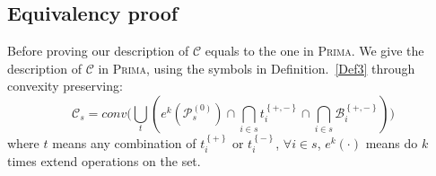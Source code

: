 \documentclass[runningheads]{llncs}
\newcommand{\prima}{\textsc{Prima}\xspace}
\begin{document}
\subsection{Equivalency proof}\label{equivalency proof}
Before proving our description of $\mathcal{C}$ equals to the one in \prima. We give the description of $\mathcal{C}$ in \prima, using the symbols in Definition.~\ref{Def3} through convexity preserving:
\begin{equation}\label{prima C}
\mathcal{C}_{s} = conv\big( \bigcup_{t} ( e^{k}(\mathcal{P}_{s}^{(0)})\cap \bigcap_{i \in s}^{}t_{i}^{\left\{ +,-\right\}} \cap \bigcap_{i \in s}^{}\mathcal{B}_{i}^{\left\{ +,-\right\}} ) \big)
\end{equation}
where $t$ means any combination of $t_{i}^{\left\{ + \right\}}$ or $t_{i}^{\left\{ - \right\}}$, $\forall i \in s$, $e^{k}(\cdot)$ means do $k$ times extend operations on the set. 
\end{document}
